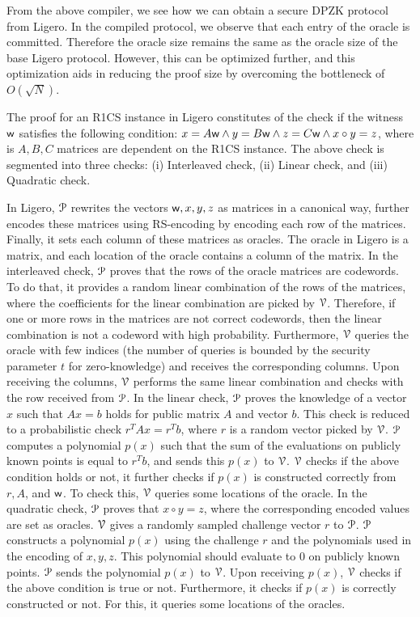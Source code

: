 From the above compiler, we see how we can obtain a secure DPZK protocol from Ligero. In the compiled protocol, we observe that each entry of the oracle is committed. Therefore the oracle size remains the same as the oracle size of the base Ligero protocol. However, this can be optimized further, and this optimization aids in reducing the proof size by overcoming the bottleneck of $O(\sqrt{N})$.

The proof for an R1CS instance in Ligero constitutes of the check if the witness $\mathsf{w}$ satisfies the following condition: $x = A \mathsf{w} \land y = B \mathsf{w} \land z = C \mathsf{w} \land x \circ y = z$, where is $A, B, C$ matrices are dependent on the R1CS instance. The above check is segmented into three checks: (i) Interleaved check, (ii) Linear check, and (iii) Quadratic check. 

In Ligero, $\mathcal{P}$ rewrites the vectors $\mathsf{w}, x, y, z$ as matrices in a canonical way, further encodes these matrices using RS-encoding by encoding each row of the matrices. Finally, it sets each column of these matrices as oracles. The oracle in Ligero is a matrix, and each location of the oracle contains a column of the matrix.
In the interleaved check, $\mathcal{P}$ proves that the rows of the oracle matrices are codewords. To do that, it provides a random linear combination of the rows of the matrices, where the coefficients for the linear combination are picked by $\mathcal{V}$. Therefore, if one or more rows in the matrices are not correct codewords, then the linear combination is not a codeword with high probability. Furthermore, $\mathcal{V}$ queries the oracle with few indices (the number of queries is bounded by the security parameter $t$ for zero-knowledge) and receives the corresponding columns. Upon receiving the columns, $\mathcal{V}$ performs the same linear combination and checks with the row received from $\mathcal{P}$.
In the linear check, $\mathcal{P}$ proves the knowledge of a vector $x$ such that $Ax = b$ holds for public matrix $A$ and vector $b$. This check is reduced to a probabilistic check $r^TAx = r^T b$, where $r$ is a random vector picked by $\mathcal{V}$. $\mathcal{P}$ computes a polynomial $p(x)$ such that the sum of the evaluations on publicly known points is equal to $r^Tb$, and sends this $p(x)$ to $\mathcal{V}$. $\mathcal{V}$ checks if the above condition holds or not, it further checks if $p(x)$ is constructed correctly from $r, A$, and $\mathsf{w}$. To check this, $\mathcal{V}$ queries some locations of the oracle.
In the quadratic check, $\mathcal{P}$ proves that $x \circ y = z$, where the corresponding encoded values are set as oracles. $\mathcal{V}$ gives a randomly sampled challenge vector $r$ to $\mathcal{P}$. $\mathcal{P}$ constructs a polynomial $p(x)$ using the challenge $r$ and the polynomials used in the encoding of $x, y, z$. This polynomial should evaluate to $0$ on publicly known points. $\mathcal{P}$ sends the polynomial $p(x)$ to $\mathcal{V}$. Upon receiving $p(x)$, $\mathcal{V}$ checks if the above condition is true or not. Furthermore, it checks if $p(x)$ is correctly constructed or not. For this, it queries some locations of the oracles.

